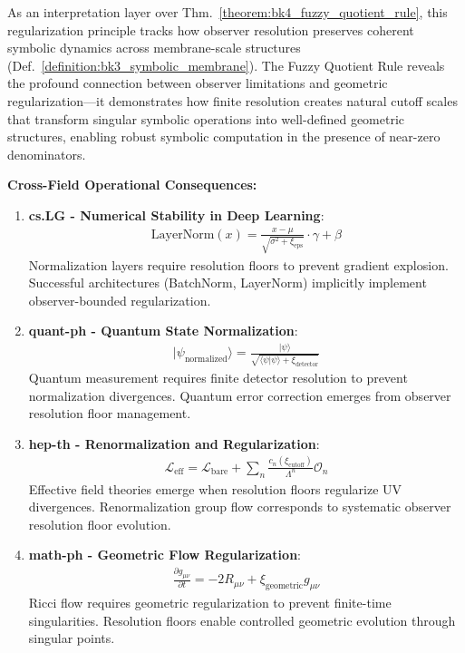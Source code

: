 \begin{scholium}
\label{scholium:bk4_symbolic_regularization}
As an interpretation layer over Thm.~\ref{theorem:bk4_fuzzy_quotient_rule}, this regularization principle tracks how observer resolution preserves coherent symbolic dynamics across membrane-scale structures (Def.~\ref{definition:bk3_symbolic_membrane}).
The Fuzzy Quotient Rule reveals the profound connection between observer limitations and geometric regularization---it demonstrates how finite resolution creates natural cutoff scales that transform singular symbolic operations into well-defined geometric structures, enabling robust symbolic computation in the presence of near-zero denominators.

\textbf{Cross-Field Operational Consequences:}

\begin{enumerate}
\item \textbf{cs.LG - Numerical Stability in Deep Learning}: 
   \begin{align}
   \text{LayerNorm}(x) = \frac{x - \mu}{\sqrt{\sigma^2 + \xi_{\text{eps}}}} \cdot \gamma + \beta
   \end{align}
   Normalization layers require resolution floors to prevent gradient explosion. Successful architectures (BatchNorm, LayerNorm) implicitly implement observer-bounded regularization.

\item \textbf{quant-ph - Quantum State Normalization}:
   \begin{align}
   |\psi_{\text{normalized}}\rangle = \frac{|\psi\rangle}{\sqrt{\langle \psi | \psi \rangle + \xi_{\text{detector}}}}
   \end{align}
   Quantum measurement requires finite detector resolution to prevent normalization divergences. Quantum error correction emerges from observer resolution floor management.

\item \textbf{hep-th - Renormalization and Regularization}:
   \begin{align}
   \mathcal{L}_{\text{eff}} = \mathcal{L}_{\text{bare}} + \sum_{n} \frac{c_n(\xi_{\text{cutoff}})}{\Lambda^n} \mathcal{O}_n
   \end{align}
   Effective field theories emerge when resolution floors regularize UV divergences. Renormalization group flow corresponds to systematic observer resolution floor evolution.

\item \textbf{math-ph - Geometric Flow Regularization}:
   \begin{align}
   \frac{\partial g_{\mu\nu}}{\partial t} = -2R_{\mu\nu} + \xi_{\text{geometric}} g_{\mu\nu}
   \end{align}
   Ricci flow requires geometric regularization to prevent finite-time singularities. Resolution floors enable controlled geometric evolution through singular points.


\end{enumerate}
\end{scholium}
